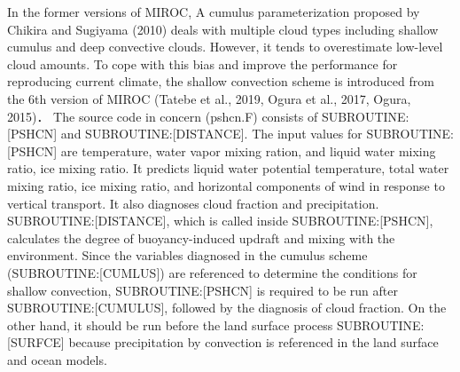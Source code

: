 In the former versions of MIROC, A cumulus parameterization proposed by Chikira and Sugiyama (2010) deals with multiple cloud types including shallow cumulus and deep convective clouds. However, it tends to overestimate low-level cloud amounts.
To cope with this bias and improve the performance for reproducing current climate, the shallow convection scheme is introduced from the 6th version of MIROC (Tatebe et al., 2019, Ogura et al., 2017, Ogura, 2015)．
The source code in concern (pshcn.F) consists of SUBROUTINE:[PSHCN] and SUBROUTINE:[DISTANCE]. The input values for SUBROUTINE:[PSHCN] are temperature, water vapor mixing ration, and liquid water mixing ratio, ice mixing ratio.
It predicts liquid water potential temperature, total water mixing ratio, ice mixing ratio, and horizontal components of wind in response to vertical transport. It also diagnoses cloud fraction and precipitation.
SUBROUTINE:[DISTANCE], which is called inside SUBROUTINE:[PSHCN], calculates the degree of buoyancy-induced updraft and mixing with the environment.
Since the variables diagnosed in the cumulus scheme (SUBROUTINE:[CUMLUS]) are referenced to determine the conditions for shallow convection, SUBROUTINE:[PSHCN] is required to be run after SUBROUTINE:[CUMULUS], followed by the diagnosis of cloud fraction.
On the other hand, it should be run before the land surface process SUBROUTINE:[SURFCE] because precipitation by convection is referenced in the land surface and ocean models.

